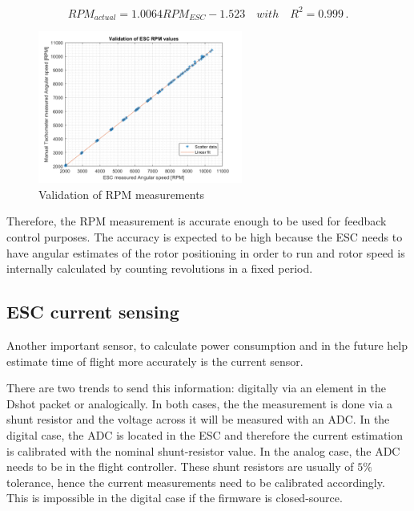 \begin{equation}
  RPM_{actual} = 1.0064RPM_{ESC}-1.523 \quad with \quad R^2=0.999\, .
    \label{eq:rpm_validation}
\end{equation}

\begin{figure} 
    \centering
    \includegraphics[width=0.6\textwidth]{images/rpm_validation.png}
    \caption{Validation of RPM measurements}
    \label{fig:rpm_validation}
\end{figure}

Therefore, the RPM measurement is accurate enough to be used for feedback control purposes. The accuracy is expected to be high because the ESC needs to have angular estimates of the rotor positioning in order to run and rotor speed is internally calculated by counting revolutions in a fixed period.

\subsection{ESC current sensing}
Another important sensor, to calculate power consumption and in the future help estimate time of flight more accurately is the current sensor. 
\newline

There are two trends to send this information: digitally via an element in the Dshot packet or analogically. In both cases, the the measurement is done via a shunt resistor and the voltage across it will be measured with an ADC. In the digital case, the ADC is located in the ESC and therefore the current estimation is calibrated with the nominal shunt-resistor value. In the analog case, the ADC needs to be in the flight controller. These shunt resistors are usually of $5\%$ tolerance, hence the current measurements need to be calibrated accordingly. This is impossible in the digital case if the firmware is closed-source.\\


